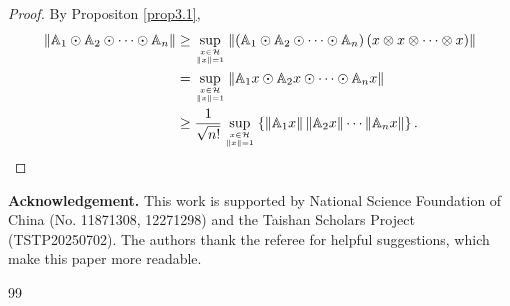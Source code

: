 \documentclass[11pt]{article}
\theoremstyle{plain}
\theoremstyle{definition}
\begin{document}
{\begin{proof}
	By Propositon \ref{prop3.1},
		\begin{align*}
		\left \| \mathbb{A}_{1}\odot \mathbb{A}_{2}\odot \cdots \odot \mathbb{A}_{n}    \right \|
		& \ge  \sup_{x\in \mathcal{H} \atop \left \| x \right \| =1}\left \| \left ( \mathbb{A}_{1}\odot \mathbb{A}_{2}\odot \cdots \odot \mathbb{A}_{n}  \right ) \left ( x\otimes x\otimes \cdots \otimes x  \right )  \right \|
		\\ & =\sup_{x\in \mathcal{H} \atop \left \| x \right \| =1}\left \| \mathbb{A}_{1}x\odot \mathbb{A}_{2}x\odot \cdots \odot \mathbb{A}_{n}x   \right \|
		\\ & \ge \frac{1}{\sqrt{n!} } \sup_{x\in \mathcal{H} \atop \left \| x \right \| =1} \left \{ \left \| \mathbb{A}_{1}x \right \| \left \| \mathbb{A}_{2}x \right \| \cdots \left \| \mathbb{A}_{n}x \right \|  \right \}.  \qedhere
	\end{align*}
\end{proof}







\noindent\textbf{Acknowledgement.} This work is supported by National Science Foundation of China (No. 11871308, 12271298) and the Taishan Scholars Project (TSTP20250702). The authors thank the referee for helpful suggestions, which make this paper more readable.



\begin{thebibliography}{99}
	


\end{thebibliography}}
\end{document}

